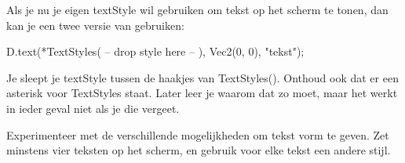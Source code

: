 Als je nu je eigen textStyle wil gebruiken om tekst op het scherm te tonen, dan kan je een twee versie van  gebruiken:

\begin{code}
D.text(*TextStyles( -- drop style here -- ), Vec2(0, 0), "tekst");
\end{code}

Je sleept je textStyle tussen de haakjes van TextStyles(). Onthoud ook dat er een asterisk voor TextStyles staat. Later leer je waarom dat zo moet, maar het werkt in ieder geval niet als je die vergeet.

\begin{exercise}
Experimenteer met de verschillende mogelijkheden om tekst vorm te geven. Zet minstens vier teksten op het scherm, en gebruik voor elke tekst een andere stijl.
\end{exercise}